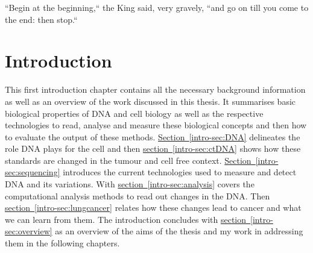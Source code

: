
\begin{savequote}[85mm]
``Begin at the beginning,`` the King said, very gravely, ``and go on till you come to the end: then stop.``
\end{savequote}

\chapter{Introduction}
\label{ch:intro}



This first introduction chapter contains all the necessary background information as well as an overview of the work discussed in this thesis. It summarises basic biological properties of DNA and cell biology as well as the respective technologies to read, analyse and measure these biological concepts and then how to evaluate the output of these methods.
\hyperref[intro-sec:DNA]{Section~\ref*{intro-sec:DNA}} delineates the role DNA plays for the cell and then \hyperref[intro-sec:ctDNA]{section~\ref{intro-sec:ctDNA}} shows how these standards are changed in the tumour and cell free context. \hyperref[intro-sec:sequencing]{Section~\ref{intro-sec:sequencing}} introduces the current technologies used to measure and detect DNA and its variations. With \hyperref[intro-sec:analysis]{section~\ref*{intro-sec:analysis}} covers the computational analysis methods to read out changes in the DNA. Then \hyperref[intro-sec:lungcancer]{section~\ref{intro-sec:lungcancer}} relates how these changes lead to cancer and what we can learn from them. 
The introduction concludes with \hyperref[intro-sec:overview]{section~\ref*{intro-sec:overview}} as an overview of the aims of the thesis and my work in addressing them in the following chapters.















